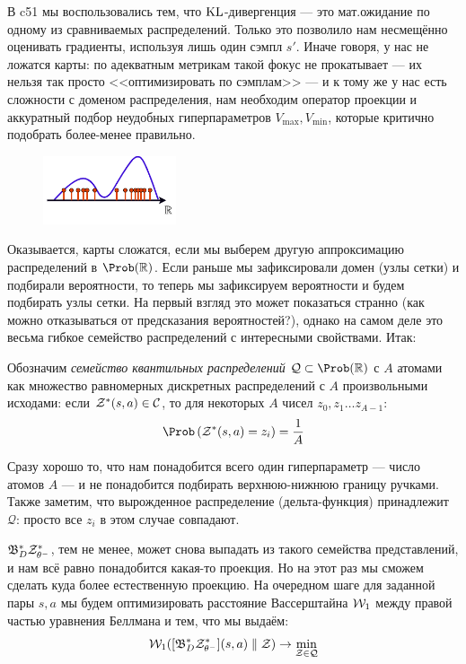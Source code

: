 В c51 мы воспользовались тем, что $\operatorname{KL}$-дивергенция --- это мат.ожидание по одному из сравниваемых распределений. Только это позволило нам несмещённо оценивать градиенты, используя лишь один сэмпл $s'$. Иначе говоря, у нас не ложатся карты: по адекватным метрикам такой фокус не прокатывает --- их нельзя так просто <<оптимизировать по сэмплам>> --- и к тому же у нас есть сложности с доменом распределения, нам необходим оператор проекции и аккуратный подбор неудобных гиперпараметров $V_{\max}, V_{\min}$, которые критично подобрать более-менее правильно.

\begin{figure}
\vspace{-0.3cm}
\centering
\includegraphics[width=0.35\textwidth]{Images/Quantile.png}
\vspace{-1.4cm}
\end{figure}

Оказывается, карты сложатся, если мы выберем другую аппроксимацию распределений в $\Prob (\R)$. Если раньше мы зафиксировали домен (узлы сетки) и подбирали вероятности, то теперь мы зафиксируем вероятности и будем подбирать узлы сетки. На первый взгляд это может показаться странно (как можно отказываться от предсказания вероятностей?), однако на самом деле это весьма гибкое семейство распределений с интересными свойствами. Итак:

\begin{definition}
Обозначим \emph{семейство квантильных распределений} $\mathcal{Q} \subset \Prob(\R)$ с $A$ атомами как множество равномерных дискретных распределений с $A$ произвольными исходами: если $\mathcal{Z}^*(s, a) \in \mathcal{C}$, то для некоторых $A$ чисел $z_0, z_1 \dots z_{A-1} \colon$
$$\Prob \left( \Z^*(s, a) = z_i \right) = \frac{1}{A}$$
\end{definition}

Сразу хорошо то, что нам понадобится всего один гиперпараметр --- число атомов $A$ --- и не понадобится подбирать верхнюю-нижнюю границу ручками. Также заметим, что вырожденное распределение (дельта-функция) принадлежит $\mathcal{Q}$: просто все $z_i$ в этом случае совпадают.

$\mathfrak{B}^*_D \mathcal{Z}^*_{\theta^-}$, тем не менее, может снова выпадать из такого семейства представлений, и нам всё равно понадобится какая-то проекция. Но на этот раз мы сможем сделать куда более естественную проекцию. На очередном шаге для заданной пары $s, a$ мы будем оптимизировать расстояние Вассерштайна $\mathcal{W}_1$ между правой частью уравнения Беллмана и тем, что мы выдаём:
\begin{equation}\label{qprojection}
\mathcal{W}_1 ([\mathfrak{B}^*_D \mathcal{Z}^*_{\theta^-}](s, a) \parallel \mathcal{Z}) \to \min_{\mathcal{Z} \in \mathcal{Q}}
\end{equation}

